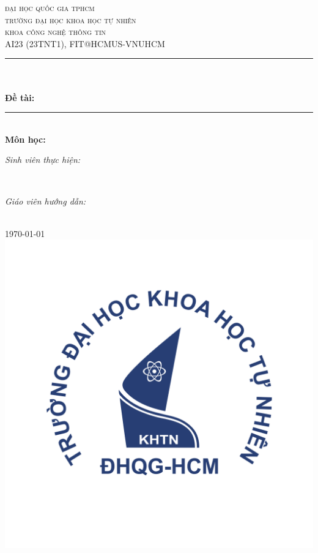 \begin{titlepage}
\newcommand{\HRule}{\rule{\linewidth}{0.5mm}}
\centering

\textsc{\LARGE đại học quốc gia tphcm}\\[1.5cm]
\textsc{\Large trường đại học khoa học tự nhiên}\\[0.5cm]
\textsc{\large khoa công nghệ thông tin}\\[0.5cm]
\textsc{AI23 (23TNT1), FIT@HCMUS-VNUHCM}\\[0.5cm]

\HRule \\[0.4cm]
{ 
\huge{\bfseries{\reporttitle}}\\[0.5cm]
\large{\bfseries{Đề tài: \reportname}}
}\\[0.4cm]
\HRule \\[0.5cm]

\textbf{\large Môn học: \coursename}\\[0.5cm]

\begin{minipage}[t]{0.5\textwidth}
\begin{flushleft} \large
\emph{Sinh viên thực hiện:}\\
\studentname
\end{flushleft}
\end{minipage}
~
\begin{minipage}[t]{0.4\textwidth}
\begin{flushright} \large
\emph{Giáo viên hướng dẫn:} \\
\teachername
\end{flushright}
\end{minipage}\\[1.5cm]

{\large \today}\\[0.5cm]

\includegraphics[scale=.3]{img/hcmus-logo.png}\\[1cm] 

\vfill
\end{titlepage}
	